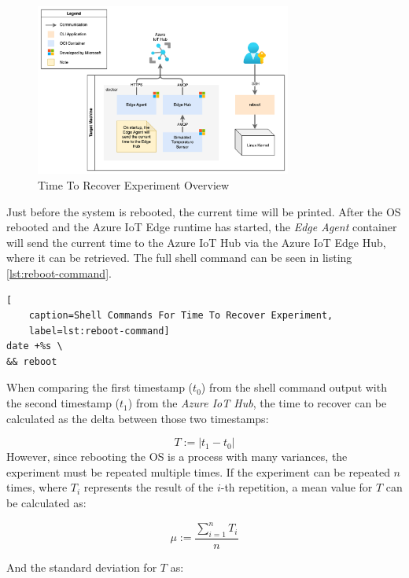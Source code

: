 \begin{figure}[H]
    \centering
    \includegraphics[width=0.75\textwidth]{fig/reboot-setup.drawio.png}
    \caption{Time To Recover Experiment Overview}
\end{figure}

\noindent
Just before the system is rebooted, the current time will be printed.
After the \ac{OS} rebooted and the Azure IoT Edge runtime has started, the
\textit{Edge Agent} container will send the current time to the Azure IoT Hub via
the Azure IoT Edge Hub, where it can be retrieved. The full shell command can
be seen in listing \ref{lst:reboot-command}.
\\

\begin{lstlisting}[
    caption=Shell Commands For Time To Recover Experiment,
    label=lst:reboot-command]
date +%s \
&& reboot
\end{lstlisting}

\noindent
When comparing the first timestamp ($t_0$) from the shell command output with the second
timestamp ($t_1$) from the \textit{Azure IoT Hub}, the time to recover can be calculated
as the delta between those two timestamps:

\begin{equation}
    T := |t_1 - t_0|
\end{equation}
However, since rebooting the \ac{OS} is a process with many variances, the experiment
must be repeated multiple times. If the experiment can be repeated $n$ times, where
$T_i$ represents the result of the $i$-th repetition, a mean value for $T$ can be
calculated as:

\begin{equation}
    \mu := \frac{\sum_{i=1}^{n}T_i}{n}
\end{equation}

\noindent
And the standard deviation for $T$ as:

